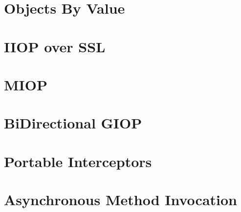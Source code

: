 \documentclass[12pt]{scrbook}
\begin{document}


\chapter{Objects By Value}
\label{ch:obv}




\chapter{IIOP over SSL}
\label{ch:SSL}




\chapter{MIOP}
\label{ch:miop}




\chapter{BiDirectional GIOP}
\label{ch:bidir}




\chapter{Portable Interceptors}
\label{ch:pi}




\chapter{Asynchronous Method Invocation}
\label{ch:AMI}



\end{document}
